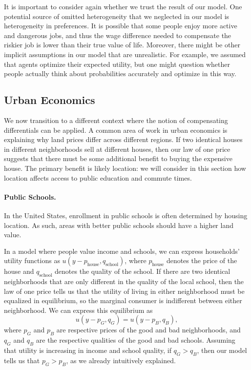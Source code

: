 It is important to consider again whether we trust the result of our model. One potential source of omitted heterogeneity that we neglected in our model is heterogeneity in preferences. It is possible that some people enjoy more active and dangerous jobs, and thus the wage difference needed to compensate the riskier job is lower than their true value of life. Moreover, there might be other implicit assumptions in our model that are unrealistic. For example, we assumed that agents optimize their expected utility, but one might question whether people actually think about probabilities accurately and optimize in this way.

\subsection*{Urban Economics}

We now transition to a different context where the notion of compensating differentials can be applied. A common area of work in urban economics is explaining why land prices differ across different regions. If two identical houses in different neighborhoods sell at different houses, then our law of one price suggests that there must be some additional benefit to buying the expensive house. The primary benefit is likely location: we will consider in this section how location affects access to public education and commute times.

\paragraph{Public Schools.} In the United States, enrollment in public schools is often determined by housing location. As such, areas with better public schools should have a higher land value. 

In a model where people value income and schools, we can express households' utility functions as $u(y-p_{\text{house}}, q_{\text{school}})$, where $p_{\text{house}}$ denotes the price of the house and $q_{\text{school}}$ denotes the quality of the school. If there are two identical neighborhoods that are only different in the quality of the local school, then the law of one price tells us that the utility of living in either neighborhood must be equalized in equilibrium, so the marginal consumer is indifferent between either neighborhood. We can express this equilibrium as 
$$u(y - p_G, q_G) = u(y-p_B, q_B),$$
where $p_G$ and $p_B$ are respective prices of the good and bad neighborhoods, and $q_G$ and $q_B$ are the respective qualities of the good and bad schools. Assuming that utility is increasing in income and school quality, if $q_G > q_B$, then our model tells us that $p_G > p_B$, as we already intuitively explained.

